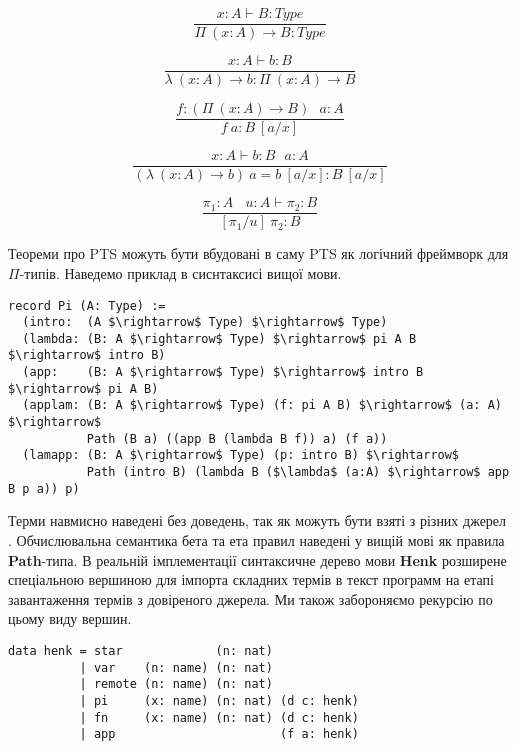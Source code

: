 \documentclass{article}
\begin{document}
\begin{equation}
\tag{$\Pi$-formation}
\dfrac
{x:A \vdash B : Type}
{\Pi\ (x:A) \rightarrow B : Type}
\end{equation}

\begin{equation}
\tag{$\lambda$-intro}
\dfrac
{x:A \vdash b : B}
{\lambda\ (x:A) \rightarrow b : \Pi\ (x: A) \rightarrow B }
\end{equation}

\begin{equation}
\tag{$App$-elimination}
\dfrac
{f: (\Pi\ (x:A) \rightarrow B)\ \ \ a: A}
{f\ a : B\ [a/x]}
\end{equation}

\begin{equation}
\tag{$\beta$-computation}
\dfrac
{x:A \vdash b: B\ \ \ a:A}
{(\lambda\ (x:A) \rightarrow b)\ a = b\ [a/x] : B\ [a/x]}
\end{equation}

\begin{equation}
\tag{subst}
\dfrac
{\pi_1 : A\ \ \ \ u:A \vdash \pi_2 : B}
{[\pi_1/u]\ \pi_2 : B}
\end{equation}

Теореми про PTS можуть бути вбудовані в саму PTS як логічний фреймворк для $\Pi$-типів.
Наведемо приклад в сиснтаксисі вищої мови.

\begin{lstlisting}[mathescape=true]
record Pi (A: Type) :=
  (intro:  (A $\rightarrow$ Type) $\rightarrow$ Type)
  (lambda: (B: A $\rightarrow$ Type) $\rightarrow$ pi A B $\rightarrow$ intro B)
  (app:    (B: A $\rightarrow$ Type) $\rightarrow$ intro B $\rightarrow$ pi A B)
  (applam: (B: A $\rightarrow$ Type) (f: pi A B) $\rightarrow$ (a: A) $\rightarrow$
           Path (B a) ((app B (lambda B f)) a) (f a))
  (lamapp: (B: A $\rightarrow$ Type) (p: intro B) $\rightarrow$
           Path (intro B) (lambda B ($\lambda$ (a:A) $\rightarrow$ app B p a)) p)
\end{lstlisting}

Терми навмисно наведені без доведень, так як можуть бути взяті з різних джерел  \cite{Henk93}.
Обчислювальна семантика бета та ета правил наведені у вищій мові як правила \textbf{Path}-типа.
В реальній імплементації синтаксичне дерево мови {\bf Henk} розширене спеціальною вершиною
для імпорта складних термів в текст программ на етапі завантаження термів з довіреного джерела.
Ми також забороняємо рекурсію по цьому виду вершин.

\begin{lstlisting}[mathescape=true]
data henk = star             (n: nat)
          | var    (n: name) (n: nat)
          | remote (n: name) (n: nat)
          | pi     (x: name) (n: nat) (d c: henk)
          | fn     (x: name) (n: nat) (d c: henk)
          | app                       (f a: henk)
\end{lstlisting}
\end{document}
